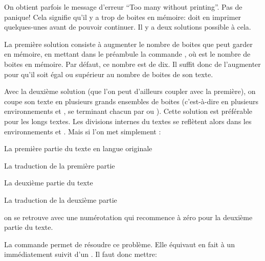 On obtient parfois le message d'erreur \enquote{Too many  without printing}. Pas de panique! Cela signifie qu'il y a trop de boites en mémoire: \latex  doit en imprimer quelques-unes avant de pouvoir continuer.  Il y a deux solutions possible à cela.

La première solution consiste à  augmenter le nombre de boites que  peut garder en mémoire, en mettant dans le préambule la commande , où  est le nombre de boites en mémoire. Par défaut, ce nombre est de dix. Il suffit donc de l'augmenter  pour qu'il soit égal ou supérieur au nombre de boites de son  texte.


Avec la deuxième solution (que l'on peut d'ailleurs coupler avec la première), on  coupe son texte en plusieurs grands ensembles de boites (c'est-à-dire en plusieurs environnements  et , se terminant chacun par  ou ).  Cette solution est préférable pour les longs textes. Les divisions internes du textes se reflètent alors dans les environnements  et .   Mais si l'on met simplement :

\begin{latexcode}
\begin{pages}  
    \begin{Leftside}  \beginnumbering 
La première partie du texte en langue originale
    \endnumbering  \end{Leftside} 
 
    \begin{Rightside} \beginnumbering
La traduction de la première partie
    \endnumbering \end{Rightside} 
 \Pages
 
    \begin{Leftside} \beginnumbering  
La deuxième partie du texte 
    \endnumbering  \end{Leftside} 
 
    \begin{Rightside}  \beginnumbering
La traduction de la deuxième partie
    \endnumbering \end{Rightside} 
 \Pages

  \end{pages}
\end{latexcode}

on se retrouve avec une numérotation qui recommence à zéro pour la deuxième partie du texte. 

La commande  permet de résoudre ce problème. Elle équivaut en fait à un  immédiatement suivit d'un . Il faut donc mettre: 

